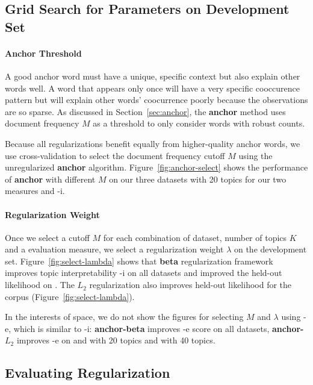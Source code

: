 \subsection{Grid Search for Parameters on Development Set}
\label{sec:parameter-search}

\paragraph{Anchor Threshold}

A good anchor word must have a unique, specific context but also
explain other words well.  A word that appears only once will have a
very specific cooccurence pattern but will explain other words'
coocurrence poorly because the observations are so
sparse.  As discussed in Section~\ref{sec:anchor}, the {\bf anchor}
method uses document frequency $M$ as a threshold to only consider
words with robust counts.

Because all regularizations benefit equally from higher-quality anchor
words, we use cross-validation to select the document frequency cutoff
$M$ using the unregularized {\bf anchor} algorithm.
Figure~\ref{fig:anchor-select} shows the performance of {\bf anchor}
with different $M$ on our three datasets with 20 topics for our two
measures  and -i.

\paragraph{Regularization Weight}

Once we select a cutoff $M$ for each combination of dataset,
number of topics $K$ and a evaluation measure, we select a regularization weight
$\lambda$ on the development set.  Figure~\ref{fig:select-lambda}
shows that {\bf beta} regularization framework improves topic
interpretability -i on all datasets and improved the held-out
likelihood  on .  The $L_2$ regularization also
improves held-out likelihood 
 for the  corpus (Figure~\ref{fig:select-lambda}).

In the interests of space, we do not show the figures for selecting $M$
 and $\lambda$ using -e, which is similar to -i: {\bf
   anchor-beta} improves -e score on all datasets, {\bf
   anchor-$L_2$} improves -e on  and 
 with 20 topics and  with 40 topics.

\subsection{Evaluating Regularization}

